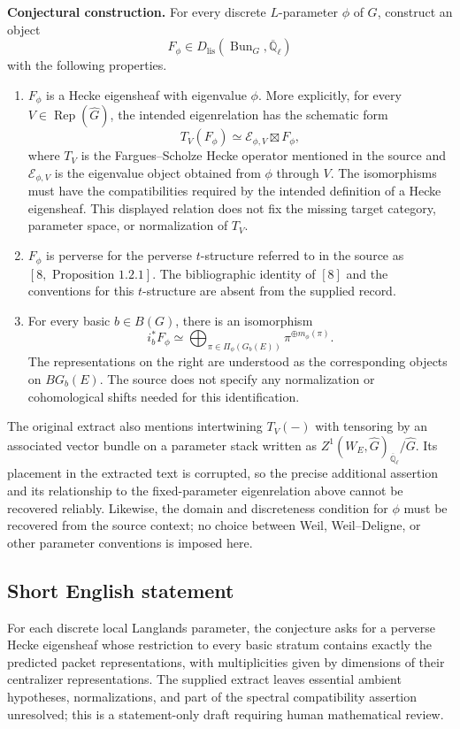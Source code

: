 \documentclass[11pt]{article}
\newcommand{\Q}{\mathbb{Q}}
\begin{document}
\textbf{Conjectural construction.} For every discrete \(L\)-parameter \(\phi\) of \(G\), construct an object
\[
F_\phi\in D_{\mathrm{lis}}(\operatorname{Bun}_G,\overline{\Q}_\ell)
\]
with the following properties.
\begin{enumerate}
\item \(F_\phi\) is a Hecke eigensheaf with eigenvalue \(\phi\). More explicitly, for every \(V\in\operatorname{Rep}(\widehat G)\), the intended eigenrelation has the schematic form
\[
T_V(F_\phi)\simeq \mathcal E_{\phi,V}\boxtimes F_\phi,
\]
where \(T_V\) is the Fargues--Scholze Hecke operator mentioned in the source and \(\mathcal E_{\phi,V}\) is the eigenvalue object obtained from \(\phi\) through \(V\). The isomorphisms must have the compatibilities required by the intended definition of a Hecke eigensheaf. This displayed relation does not fix the missing target category, parameter space, or normalization of \(T_V\).
\item \(F_\phi\) is perverse for the perverse \(t\)-structure referred to in the source as \([8,\text{ Proposition }1.2.1]\). The bibliographic identity of \([8]\) and the conventions for this \(t\)-structure are absent from the supplied record.
\item For every basic \(b\in B(G)\), there is an isomorphism
\[
i_b^*F_\phi\simeq
\bigoplus_{\pi\in\Pi_\phi(G_b(E))}
\pi^{\oplus m_\phi(\pi)}.
\]
The representations on the right are understood as the corresponding objects on \(B G_b(E)\). The source does not specify any normalization or cohomological shifts needed for this identification.
\end{enumerate}

The original extract also mentions intertwining \(T_V(-)\) with tensoring by an associated vector bundle on a parameter stack written as \(Z^1(W_E,\widehat G)_{\overline{\Q}_\ell}/\widehat G\). Its placement in the extracted text is corrupted, so the precise additional assertion and its relationship to the fixed-parameter eigenrelation above cannot be recovered reliably. Likewise, the domain and discreteness condition for \(\phi\) must be recovered from the source context; no choice between Weil, Weil--Deligne, or other parameter conventions is imposed here.
\subsection{Short English statement}
For each discrete local Langlands parameter, the conjecture asks for a perverse Hecke eigensheaf whose restriction to every basic stratum contains exactly the predicted packet representations, with multiplicities given by dimensions of their centralizer representations. The supplied extract leaves essential ambient hypotheses, normalizations, and part of the spectral compatibility assertion unresolved; this is a statement-only draft requiring human mathematical review.
\end{document}
